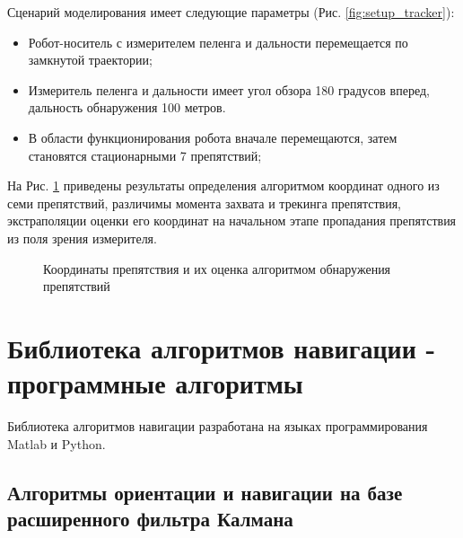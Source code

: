 \documentclass[14pt]{article}
\begin{document}
Сценарий моделирования имеет следующие параметры (Рис. \ref{fig:setup_tracker}):

\begin{itemize}
\item Робот-носитель с измерителем пеленга и дальности перемещается по замкнутой траектории;
\item Измеритель пеленга и дальности имеет угол обзора 180 градусов вперед, дальность обнаружения 100 метров. 
\item В области функционирования робота вначале перемещаются, затем становятся стационарными 7 препятствий; 
\end{itemize}

На Рис. \ref{fig:target_tracker} приведены результаты определения алгоритмом координат одного из семи препятствий, различимы момента захвата и трекинга препятствия, экстраполяции оценки его координат на начальном этапе пропадания препятствия из поля зрения измерителя.

\begin{figure}
\noindent{}
\caption{Координаты препятствия и их оценка алгоритмом обнаружения препятствий}
\label{fig:target_tracker}
\end{figure}

\section{Библиотека алгоритмов навигации - программные алгоритмы}
Библиотека алгоритмов навигации разработана на языках программирования Matlab и Python.

\subsection{Алгоритмы ориентации и навигации на базе расширенного фильтра Калмана}
\end{document}
